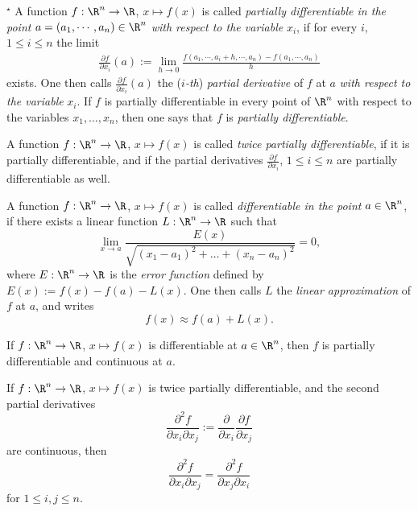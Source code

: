\begin{definition}\hspace{-3mm}$^\star$
  A function $f:\R^n \rightarrow \R$, $x\mapsto f(x)$ is called 
  \emph{partially differentiable in the point} 
  $a=(a_1,\cdots , a_n) \in \R^n$ \emph{with respect to the variable} $x_i$, 
  if for every $i$, $1 \leq i \leq n$ the limit
\begin{equation*}
  \begin{split}
   \frac{\partial f}{\partial x_i} (a) := \lim_{h\rightarrow 0} \frac{ f (a_1, \cdots, a_i+h, \cdots , a_n) - 
   f(a_1,\cdots , a_n)}{h}
  \end{split}
\end{equation*}
exists. One then calls  $\frac{\partial f}{\partial x_i} (a)$ 
the (\emph{$i$-th}) \emph{partial derivative} of $f$ at $a$ \emph{with respect to the variable} $x_i$. 
If $f$  is partially differentiable in every  point of $\R^n$ with respect to the variables $x_1,\ldots,x_n$, 
then one says that $f$ is \emph{partially differentiable}.
 
 A function $f:\R^n \rightarrow \R$, $x\mapsto f(x)$ is called \emph{twice partially differentiable}, 
 if it is partially differentiable, and if the partial derivatives  
 $\frac{\partial f}{\partial x_i}$, $1\leq i \leq n$  are partially differentiable as well.
 
 A function $f:\R^n \rightarrow \R$, $x\mapsto f(x)$ is called \emph{differentiable in the point} 
 $a \in \R^n$, if there exists a linear function $L:\R^n\rightarrow \R$ such that 
 \begin{displaymath}
   \lim_{x \rightarrow a} \frac{E(x)}{\sqrt{(x_1-a_1)^2 + \ldots + (x_n-a_n)^2}} =0,
 \end{displaymath}
 where $E:\R^n\rightarrow \R$ is the \emph{error function} defined by 
 $E(x) := f(x)-f(a) -L(x)$. One then calls $L$ the \emph{linear approximation} of $f$ at $a$,
 and writes 
 \begin{displaymath}
   f(x) \approx f(a) + L (x) .
 \end{displaymath}
\end{definition}

\begin{theorem}
  If  $f:\R^n \rightarrow \R$, $x\mapsto f(x)$ is differentiable at $a \in \R^n$, then $f$ is
  partially differentiable and continuous at $a$. 
\end{theorem}
\begin{theorem}
  If $f:\R^n \rightarrow \R$, $x\mapsto f(x)$ is twice partially differentiable, and the second partial 
  derivatives
  \begin{displaymath}
    \frac{\partial^2f}{\partial x_i \partial x_j} :=  \frac{\partial }{\partial x_i}
    \frac{\partial f}{ \partial x_j}
  \end{displaymath}
  are continuous, then 
  \begin{displaymath}
    \frac{\partial^2f}{\partial x_i \partial x_j} = \frac{\partial^2f}{\partial x_j \partial x_i}
   \end{displaymath}
  for $1\leq i,j\leq n$.
\end{theorem}


